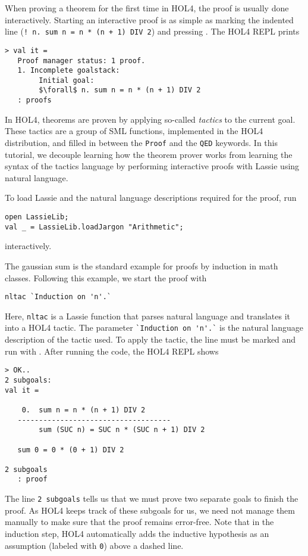 When proving a theorem for the first time in HOL4, the proof is usually done
interactively.
Starting an interactive proof is as simple as marking the indented line
(\lstinline{! n. sum n = n * (n + 1) DIV 2}) and pressing .
The HOL4 REPL prints

\begin{lstlisting}[mathescape=true, frame=single]
> val it =
   Proof manager status: 1 proof.
   1. Incomplete goalstack:
        Initial goal:
        $\forall$ n. sum n = n * (n + 1) DIV 2
   : proofs
\end{lstlisting}

In HOL4, theorems are proven by applying so-called \emph{tactics} to the current
goal.
These tactics are a group of SML functions, implemented in the HOL4
distribution, and filled in between the \lstinline{Proof} and the \lstinline{QED}
keywords.
In this tutorial, we decouple learning how the theorem prover works from
learning the syntax of the tactics language by performing interactive proofs
with Lassie using natural language.

To load Lassie and the natural language descriptions required for the proof,
run
\begin{lstlisting}
open LassieLib;
val _ = LassieLib.loadJargon "Arithmetic";
\end{lstlisting}
interactively.

The gaussian sum is the standard example for proofs by induction in math classes.
Following this example, we start the proof with
\begin{lstlisting}
nltac `Induction on 'n'.`
\end{lstlisting}

Here, \lstinline{nltac} is a Lassie function that parses natural language and
translates it into a HOL4 tactic.
The parameter \lstinline{`Induction on 'n'.`} is the natural language
description of the tactic used.
To apply the tactic, the line must be marked and run with .
After running the code, the HOL4 REPL shows
\begin{lstlisting}
> OK..
2 subgoals:
val it =

    0.  sum n = n * (n + 1) DIV 2
   ------------------------------------
        sum (SUC n) = SUC n * (SUC n + 1) DIV 2

   sum 0 = 0 * (0 + 1) DIV 2

2 subgoals
   : proof
\end{lstlisting}

The line \lstinline{2 subgoals} tells us that we must prove two separate goals
to finish the proof.
As HOL4 keeps track of these subgoals for us, we need not manage them manually
to make sure that the proof remains error-free.
Note that in the induction step, HOL4 automatically adds the inductive
hypothesis as an assumption (labeled with \lstinline{0}) above a dashed line.

